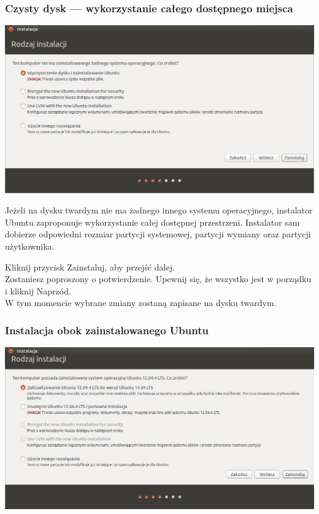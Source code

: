 \subsubsection{Czysty dysk --- wykorzystanie całego dostępnego miejsca}
\begin{center}
        \includegraphics[width=\linewidth]{images/instalator_partycjonowanie_proste.png}
\end{center}

Jeżeli na dysku twardym nie ma żadnego innego systemu operacyjnego, instalator Ubuntu zaproponuje wykorzystanie całej dostępnej przestrzeni. Instalator sam dobierze odpowiedni rozmiar partycji systemowej, partycji wymiany oraz partycji użytkownika.
\begin{flushright}
Kliknij przycisk \textcolor{ubuntu_orange}{Zainstaluj}, aby przejść dalej.\\
Zostaniesz poproszony o potwierdzenie. Upewnij się, że wszystko jest w porządku i kliknij \textcolor{ubuntu_orange}{Naprzód}.\\
W tym momencie wybrane zmiany zostaną zapisane na dysku twardym.
\end{flushright}

\subsubsection{Instalacja obok zainstalowanego Ubuntu}
\begin{center}
        \includegraphics[width=\linewidth]{images/instalator_partycjonowanie_obok_ubuntu.png}
\end{center}

